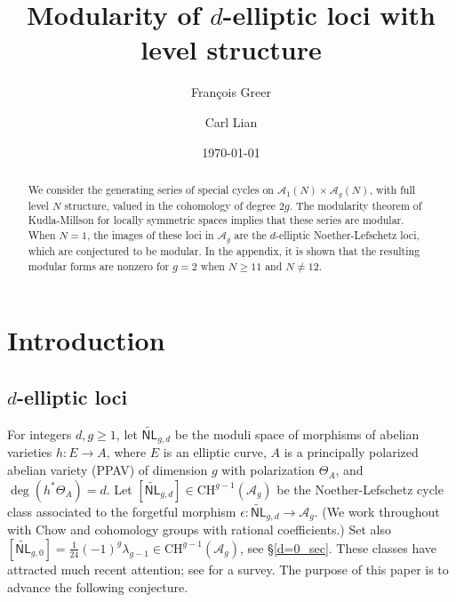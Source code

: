 \documentclass[12pt]{amsart}
\def\cA{\mathcal{A}}
\newcommand{\A}{\mathcal A}
\newcommand{\CH}{\mathrm{CH}}
\newcommand{\wNL}{{\widetilde{\mathsf{NL}}}}
\theoremstyle{definition}
\begin{document}
\title{Modularity of $d$-elliptic loci with level structure}

\author{Fran\c cois Greer}
\address{Michigan State University, Department of Mathematics, 619 Red Cedar Rd
\hfill \newline\texttt{}
 \indent East Lansing, MI 48824}

\author{Carl Lian}

\address{Tufts University, Department of Mathematics, 177 College Ave
\hfill \newline\texttt{}
 \indent Medford, MA 02155} 
\address{Princeton University, Department of Mathematics, Fine Hall, Washington Road \hfill \newline\texttt{}
 \indent Princeton, NJ 08540} 
\date{\today}




\begin{abstract}
We consider the generating series of special cycles on $\A_1(N)\times \A_g(N)$, with full level $N$ structure, valued in the cohomology of degree $2g$. The modularity theorem of Kudla-Millson for locally symmetric spaces implies that these series are modular. When $N=1$, the images of these loci in $\cA_g$ are the $d$-elliptic Noether-Lefschetz loci, which are conjectured to be modular. In the appendix, it is shown that the resulting modular forms are nonzero for $g=2$ when $N\geq 11$ and $N\neq 12$.
\end{abstract}

\maketitle

\section{Introduction}

\subsection{$d$-elliptic loci}

For integers $d,g\ge1$, let $\wNL_{g,d}$ be the moduli space of morphisms of abelian varieties $h:E\to A$, where $E$ is an elliptic curve, $A$ is a principally polarized abelian variety (PPAV) of dimension $g$ with polarization $\Theta_A$, and $\deg(h^{*}\Theta_A)=d$. Let $[\wNL_{g,d}]\in \CH^{g-1}(\cA_g)$ be the Noether-Lefschetz cycle class associated to the forgetful morphism $\epsilon:\wNL_{g,d}\to \cA_g$. (We work throughout with Chow and cohomology groups with rational coefficients.) Set also $[\wNL_{g,0}]=\frac{1}{24}(-1)^g\lambda_{g-1}\in \CH^{g-1}(\cA_g)$, see \S\ref{d=0_sec}. These classes have attracted much recent attention; see \cite{pand_notes_24} for a survey. The purpose of this paper is to advance the following conjecture.
\end{document}
